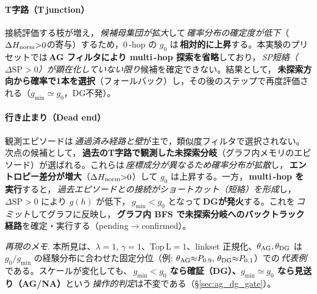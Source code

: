 \documentclass[ja=standard,xelatex]{bxjsarticle}
\begin{document}
\paragraph{T字路（T\,junction）}
接続評価する枝が増え，\,\emph{候補母集団が拡大}して\,\emph{確率分布の確定度が低下}（$\Delta H_{\rm norm}{>}0$の寄与）するため，0\,\mbox{-}hop の $g_0$ は\,\textbf{相対的に上昇}する。本実験のプリセットでは\,\textbf{AG フィルタにより multi\,\mbox{-}hop 探索を省略}しており，\,\emph{SP短絡（$\Delta\mathrm{SP}{>}0$）が顕在化していない限り}候補を確定できない。結果として，\,\textbf{未探索方向から確率で1本を選択}（フォールバック）し，その後のステップで再度評価される（$g_{\min}{\simeq}g_0$，DG不発）。

\paragraph{行き止まり（Dead end）}
観測エピソードは\,\emph{通過済み経路と壁}が主で，類似度フィルタで選択されない。次点の候補として，\,\textbf{過去のT字路で観測した未探索分岐}（グラフ内メモリのエピソード）が選ばれる。これらは\,\emph{座標成分が異なるため確率分布が拡散}し，\,\textbf{エントロピー差分が増大}（$\Delta H_{\rm norm}{>}0$）して $g_0$ は上昇する。一方，\,\textbf{multi\,\mbox{-}hop を実行}すると，\,\emph{過去エピソードとの接続がショートカット（短絡）を形成}し，\,$\Delta\mathrm{SP}{>}0$ により $g(h)$ が低下，\,$g_{\min}{<}g_0$ となって\,\textbf{DGが発火}する。これを\,\emph{コミット}してグラフに反映し，\,\textbf{グラフ内 BFS で未探索分岐へのバックトラック経路}を確定・実行する（pending$\to$confirmed）。

\noindent\textit{再現のメモ}. 本所見は、$\lambda{=}1,\,\gamma{=}1$、Top\,L$=1$、linkset 正規化、$\theta_{\rm AG},\theta_{\rm DG}$ は $g_0/g_{\min}$ の経験分布に合わせた固定分位（例: $\theta_{\rm AG}{\approx}P_{0.9},\,\theta_{\rm DG}{\approx}P_{0.1}$）での\,\emph{代表例}である。スケールが変化しても、\,\textbf{$g_{\min}{<}g_0$ なら確証（DG）、$g_{\min}{\simeq}g_0$ なら見送り（AG/NA）}という\,\emph{操作的判定}は不変である（§\ref{sec:ag_dg_gate}）。
\end{document}
